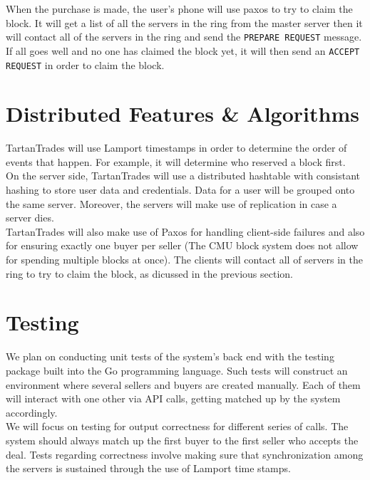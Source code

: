 \documentclass[12pt]{article}
\begin{document}
When the purchase is made, the user's phone will use paxos to try to claim the block.  It will get a list of all the servers in the ring from the master
server then it will contact all of the servers in the ring and send the \verb|PREPARE REQUEST| message.  If all goes well and no one has claimed the block yet, it will then send an \verb|ACCEPT REQUEST| in order to claim
the block.

\section{Distributed Features \& Algorithms}

TartanTrades will use Lamport timestamps in order to determine the order of events that happen.  For example, it will determine who reserved a block first.\\

On the server side, TartanTrades will use a distributed hashtable with consistant hashing to store user data and credentials.  Data for a user will be grouped onto the same server.  Moreover, the
servers will make use of replication in case a server dies.\\

TartanTrades will also make use of Paxos for handling client-side failures and also for ensuring exactly one buyer per seller (The CMU block system does not allow
for spending multiple blocks at once).  The clients will contact all of servers in the ring to try to claim the block, as dicussed in the previous section.

\section{Testing}

We plan on conducting unit tests of the system's back end with the testing package built into the Go programming language. Such tests will construct an environment where several sellers and buyers are created manually. Each of them will interact with one other via API calls, getting matched up by the system accordingly.\\

We will focus on testing for output correctness for different series of calls. The system should always match up the first buyer to the first seller who accepts the deal. Tests regarding correctness involve making sure that synchronization among the servers is sustained through the use of Lamport time stamps.\\
\end{document}
